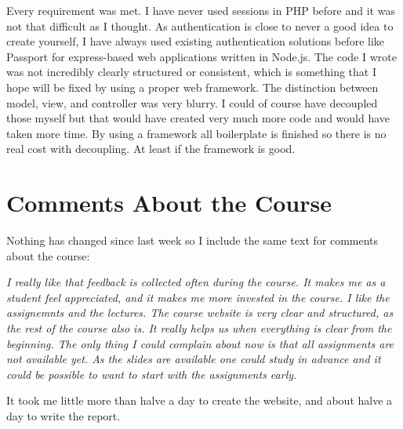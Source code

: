 \documentclass[a4paper]{scrartcl}
\begin{document}
\noindent
Every requirement was met. I have never used sessions in PHP before and it was not that difficult as I thought. As authentication is close to never a good idea to create yourself, I have always used existing authentication solutions before like Passport for express-based web applications written in Node.js. The code I wrote was not incredibly clearly structured or consistent, which is something that I hope will be fixed by using a proper web framework. The distinction between model, view, and controller was very blurry. I could of course have decoupled those myself but that would have created very much more code and would have taken more time. By using a framework all boilerplate is finished so there is no real cost with decoupling. At least if the framework is good.

\section{Comments About the Course}

Nothing has changed since last week so I include the same text for comments about the course:

\textit{I really like that feedback is collected often during the course. It makes me as a student feel appreciated, and it makes me more invested in the course. I like the assignemnts and the lectures. The course website is very clear and structured, as the rest of the course also is. It really helps us when everything is clear from the beginning. The only thing I could complain about now is that all assignments are not available yet. As the slides are available one could study in advance and it could be possible to want to start with the assignments early.}

It took me little more than halve a day to create the website, and about halve a day to write the report.
\end{document}

